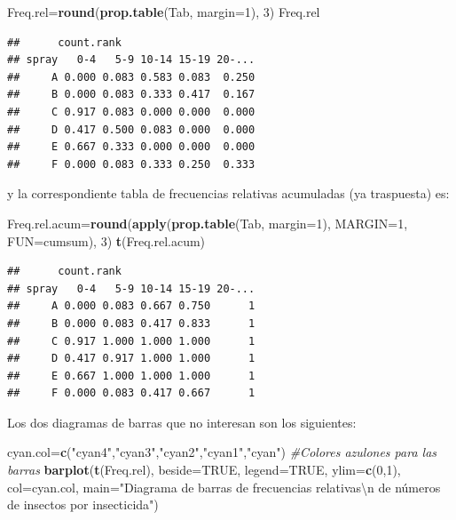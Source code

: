 \documentclass[]{book}
\newenvironment{Shaded}{\begin{snugshade}}{\end{snugshade}}
\newcommand{\CharTok}[1]{\textcolor[rgb]{0.31,0.60,0.02}{#1}}
\newcommand{\CommentTok}[1]{\textcolor[rgb]{0.56,0.35,0.01}{\textit{#1}}}
\newcommand{\DataTypeTok}[1]{\textcolor[rgb]{0.13,0.29,0.53}{#1}}
\newcommand{\DecValTok}[1]{\textcolor[rgb]{0.00,0.00,0.81}{#1}}
\newcommand{\KeywordTok}[1]{\textcolor[rgb]{0.13,0.29,0.53}{\textbf{#1}}}
\newcommand{\NormalTok}[1]{#1}
\newcommand{\OtherTok}[1]{\textcolor[rgb]{0.56,0.35,0.01}{#1}}
\newcommand{\StringTok}[1]{\textcolor[rgb]{0.31,0.60,0.02}{#1}}
\theoremstyle{definition}
\theoremstyle{definition}
\theoremstyle{definition}
\theoremstyle{remark}
\begin{document}
\begin{Shaded}
\begin{Highlighting}[]
\NormalTok{Freq.rel=}\KeywordTok{round}\NormalTok{(}\KeywordTok{prop.table}\NormalTok{(Tab, }\DataTypeTok{margin=}\DecValTok{1}\NormalTok{), }\DecValTok{3}\NormalTok{)}
\NormalTok{Freq.rel}
\end{Highlighting}
\end{Shaded}

\begin{verbatim}
##      count.rank
## spray   0-4   5-9 10-14 15-19 20-...
##     A 0.000 0.083 0.583 0.083  0.250
##     B 0.000 0.083 0.333 0.417  0.167
##     C 0.917 0.083 0.000 0.000  0.000
##     D 0.417 0.500 0.083 0.000  0.000
##     E 0.667 0.333 0.000 0.000  0.000
##     F 0.000 0.083 0.333 0.250  0.333
\end{verbatim}

y la correspondiente tabla de frecuencias relativas acumuladas (ya traspuesta) es:

\begin{Shaded}
\begin{Highlighting}[]
\NormalTok{Freq.rel.acum=}\KeywordTok{round}\NormalTok{(}\KeywordTok{apply}\NormalTok{(}\KeywordTok{prop.table}\NormalTok{(Tab, }\DataTypeTok{margin=}\DecValTok{1}\NormalTok{), }\DataTypeTok{MARGIN=}\DecValTok{1}\NormalTok{, }\DataTypeTok{FUN=}\NormalTok{cumsum), }\DecValTok{3}\NormalTok{)}
\KeywordTok{t}\NormalTok{(Freq.rel.acum)}
\end{Highlighting}
\end{Shaded}

\begin{verbatim}
##      count.rank
## spray   0-4   5-9 10-14 15-19 20-...
##     A 0.000 0.083 0.667 0.750      1
##     B 0.000 0.083 0.417 0.833      1
##     C 0.917 1.000 1.000 1.000      1
##     D 0.417 0.917 1.000 1.000      1
##     E 0.667 1.000 1.000 1.000      1
##     F 0.000 0.083 0.417 0.667      1
\end{verbatim}

Los dos diagramas de barras que no interesan son los siguientes:

\begin{Shaded}
\begin{Highlighting}[]
\NormalTok{cyan.col=}\KeywordTok{c}\NormalTok{(}\StringTok{"cyan4"}\NormalTok{,}\StringTok{"cyan3"}\NormalTok{,}\StringTok{"cyan2"}\NormalTok{,}\StringTok{"cyan1"}\NormalTok{,}\StringTok{"cyan"}\NormalTok{) }\CommentTok{#Colores azulones para las barras}
\KeywordTok{barplot}\NormalTok{(}\KeywordTok{t}\NormalTok{(Freq.rel), }\DataTypeTok{beside=}\OtherTok{TRUE}\NormalTok{, }\DataTypeTok{legend=}\OtherTok{TRUE}\NormalTok{,  }\DataTypeTok{ylim=}\KeywordTok{c}\NormalTok{(}\DecValTok{0}\NormalTok{,}\DecValTok{1}\NormalTok{), }\DataTypeTok{col=}\NormalTok{cyan.col, }
  \DataTypeTok{main=}\StringTok{"Diagrama de barras de frecuencias relativas}\CharTok{\textbackslash{}n}\StringTok{ de números de insectos por insecticida"}\NormalTok{)}
\end{Highlighting}
\end{Shaded}
\end{document}
